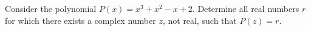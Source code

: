 Consider the polynomial \(P(x)=x^3+x^2-x+2\). Determine all real numbers \(r\) for which there exists a complex number \(z\), not real, such that \(P(z)=r\).
